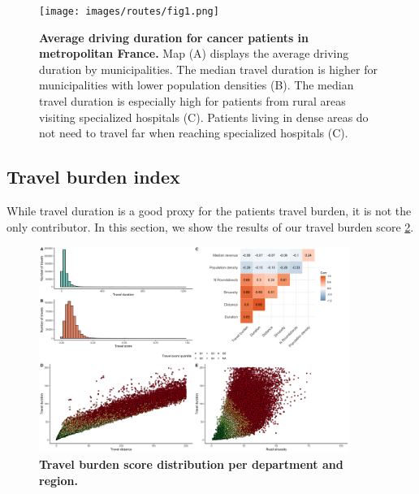 \begin{figure}[h!]
    \texttt{[image: images/routes/fig1.png]}
    \centering
    \caption{ \textbf{Average driving duration for cancer patients in
            metropolitan France.} Map (A) displays the average driving duration by
        municipalities. The median travel duration is higher for municipalities
        with lower population densities (B). The median travel duration is
        especially high for patients from rural areas visiting specialized
        hospitals (C). Patients living in dense areas do not need to travel far
        when reaching specialized hospitals (C). }
    \label{fig:routes-duration-france}
\end{figure}

\subsection{Travel burden index}

While travel duration is a good proxy for the patients travel burden, it is not
the only contributor. In this section, we show the results of our travel burden
score \cref{fig:routes-burden-distribution}.

\begin{figure}[h!]
    \includegraphics[width=0.9\textwidth]{images/routes/sup_fig_3.png}
    \centering
    \caption{
        \textbf{Travel burden score distribution per department and region.}}
    \label{fig:routes-burden-distribution}
\end{figure}


